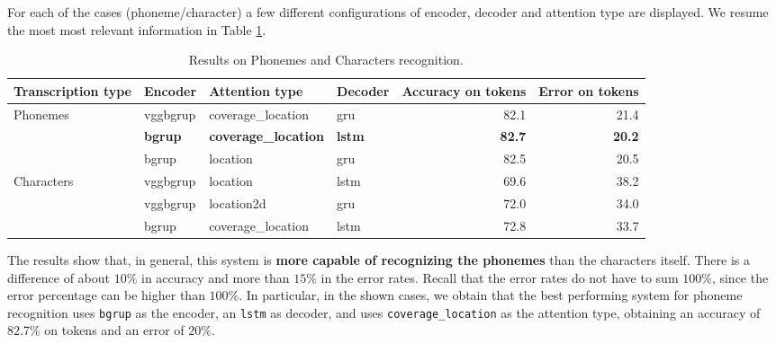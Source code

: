 \documentclass[a4paper]{article}
\def\inline{\lstinline[basicstyle=\ttfamily,keywordstyle={}]}
\begin{document}
\begin{itemize}
        For each of the cases (phoneme/character) a few different configurations of encoder, decoder and attention type are displayed. We resume the most most relevant information in Table \ref{table:results:1}.
        \begin{table}[H]
          \begin{tabular}{l|lllrr}
          Transcription type & Encoder        & Attention type              & Decoder       & \multicolumn{1}{l}{Accuracy on tokens} & \multicolumn{1}{l}{Error on tokens} \\ \hline
          Phonemes           & vggbgrup       & coverage\_location          & gru           & 82.1                                   & 21.4                                \\
                             & \textbf{bgrup} & \textbf{coverage\_location} & \textbf{lstm} & \textbf{82.7}                          & \textbf{20.2}                       \\
                             & bgrup          & location                    & gru           & 82.5                                   & 20.5                                \\
          Characters         & vggbgrup       & location                    & lstm          & 69.6                                   & 38.2                                \\
                             & vggbgrup       & location2d                  & gru           & 72.0                                   & 34.0                                \\
                             & bgrup          & coverage\_location          & lstm          & 72.8                                   & 33.7                               
          \end{tabular}
          \caption{Results on Phonemes and Characters recognition.}

          \label{table:results:1}
          \end{table}
          The results show that, in general, this system is \textbf{more capable of recognizing the phonemes} than the characters itself. There is a difference of about \(10\%\) in accuracy and more than \(15\%\) in the error rates. Recall that the error rates do not have to sum \(100\%\), since the error percentage can be higher than \(100\%\). In particular, in the shown cases, we obtain that the best performing system for phoneme recognition uses \inline{bgrup} as the encoder, an \inline{lstm} as decoder, and uses \inline{coverage_location} as the attention type, obtaining an accuracy of \(82.7\%\) on tokens and an error of \(20\%\).
\end{itemize}
\end{document}
